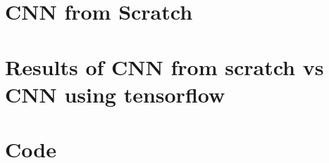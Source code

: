 \documentclass[a4paper,11pt,twoside]{report}
\begin{document}
	
	
	\tableofcontents
	\listoffigures
	\lstlistoflistings
	
	\chapter{CNN from Scratch}
	
	\chapter{Results of CNN from scratch vs CNN using tensorflow}
	\label{chap:kef2}
	
	\appendix
	\chapter{Code}
	\label{appendix:app}
	
	
\end{document}

